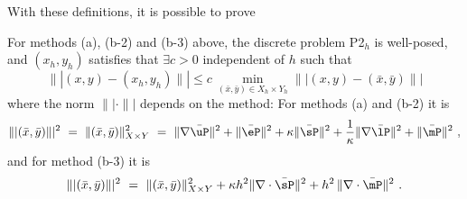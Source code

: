 \noindent With these definitions, it is possible to prove

\bigskip

\begin{theorem} For methods (a), (b-2) and (b-3) above, the discrete problem P2$_h$ is well-posed, and $(x_h,y_h)$ satisfies that $\exists c>0$ independent of $h$ such that
	\begin{equation}
		\||(x,y)-(x_h,y_h)\|| \leq c\,\min_{(\bar{x},\bar{y})\in X_h\times Y_h}
		\||(x,y)-(\bar{x},\bar{y})\||
		\label{eq:bestapprox}
	\end{equation}
where the norm $\||\cdot\||$ depends on the method: For methods (a) and (b-2) it is
\begin{equation}
\||(\bar{x},\bar{y})\||^2 ~=~ \|(\bar{x},\bar{y})\|^2_{X\times Y} ~=~ \|\nabla \bar{\uP} \|^2 +\|\bar{\eP}\|^2 + \kappa \|\bar{\sP}\|^2 +  \frac{1}{\kappa} \|\nabla \bar{\lP}\|^2 + \|\bar{\mP}\|^2 ~,
\end{equation}
and for method (b-3) it is 
\begin{equation}
\||(\bar{x},\bar{y})\||^2 ~=~ \|(\bar{x},\bar{y})\|^2_{X\times Y}  + \kappa h^2 \|\nabla \cdot \bar{\sP}\|^2  + h^2\,\|\nabla \cdot \bar{\mP}\|^2~.
	\end{equation}
\end{theorem}


